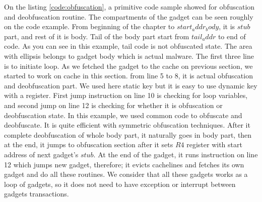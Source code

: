 			On the listing \ref{code:obfuscation}, a primitive code sample showed for obfuscation and deobfuscation routine. The compartments of the gadget can be seen roughly on the code example. From beginning of the chapter to $start_addr_body$, it is $stub$ part, and rest of it is body. Tail of the body part start from $tail_addr$ to end of code. As you can see in this example, tail code is not obfuscated state. The area with ellipsis belongs to gadget body which is actual malware. The first three line is to initiate loop. As we fetched the gadget to the cache on previous section, we started to work on cache in this section. from line 5 to 8, it is actual obfuscation and deobfuscation part. We used here static key but it is easy to use dynamic key with a register. First jump instruction on line 10 is checking for loop variables, and second jump on line 12 is checking for whether it is obfuscation or deobfuscation state. In this example, we used common code to obfuscate and deobfuscate. It is quite efficient with symmetric obfuscation techniques. After it complete deobfuscation of whole body part, it naturally goes in body part, then at the end, it jumps to obfuscation section after it sets $R4$ register with start address of next gadget's $stub$. At the end of the gadget, it runs instruction on line 12 which jumps new gadget, therefore; it evicts cachelines and fetches its own gadget and do all these routines. We consider that all these gadgets works as a loop of gadgets, so it does not need to have exception or interrupt between gadgets transactions.


